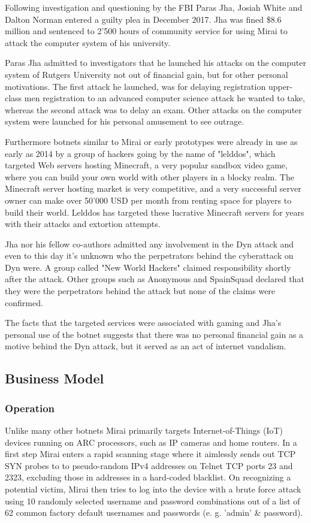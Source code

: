 Following investigation and questioning by the FBI Paras Jha, Josiah White and Dalton Norman entered a guilty plea in December 2017. Jha was fined \$8.6 million and sentenced to 2'500 hours of community service for using Mirai to attack the computer system of his university.

Paras Jha admitted to investigators that he launched his attacks on the computer system of Rutgers University not out of financial gain, but for other personal motivations. The first attack he launched, was for delaying registration upper-class men registration to an advanced computer science attack he wanted to take, whereas the second attack was to delay an exam. Other attacks on the computer system were launched for his personal amusement to see outrage.

Furthermore botnets similar to Mirai or early prototypes were already in use as early as 2014 by a group of hackers going by the name of "lelddos", which targeted Web servers hosting Minecraft, a very popular sandbox video game, where you can build your own world with other players in a blocky realm. The Minecraft server hosting market is very competitive, and a very successful server owner can make over 50'000 USD per month from renting space for players to build their world. Lelddos has targeted these lucrative Minecraft servers for years with their attacks and extortion attempts. 

Jha nor his fellow co-authors admitted any involvement in the Dyn attack and even to this day it's unknown who the perpetrators behind the cyberattack on Dyn were. A group called "New World Hackers" claimed responsibility shortly after the attack. Other groups such as Anonymous and SpainSquad declared that they were the perpetrators behind the attack but none of the claims were confirmed.

The facts that the targeted services were associated with gaming and Jha's personal use of the botnet suggests that there was no personal financial gain as a motive behind the Dyn attack, but it served as an act of internet vandalism.


	\subsection{Business Model}
		\subsubsection{Operation}
		Unlike many other botnets Mirai primarily targets Internet-of-Things (IoT) devices running on ARC processors, such as IP cameras and home routers. In a first step Mirai enters a rapid scanning stage where it aimlessly sends out TCP SYN probes to to pseudo-random IPv4 addresses on Telnet TCP ports 23 and 2323, excluding those in addresses in a hard-coded blacklist. On recognizing a potential victim, Mirai then tries to log into the device with a brute force attack using 10 randomly selected username and password combinations out of a list of 62 common factory default usernames and passwords (e. g. 'admin' \& password).
		
